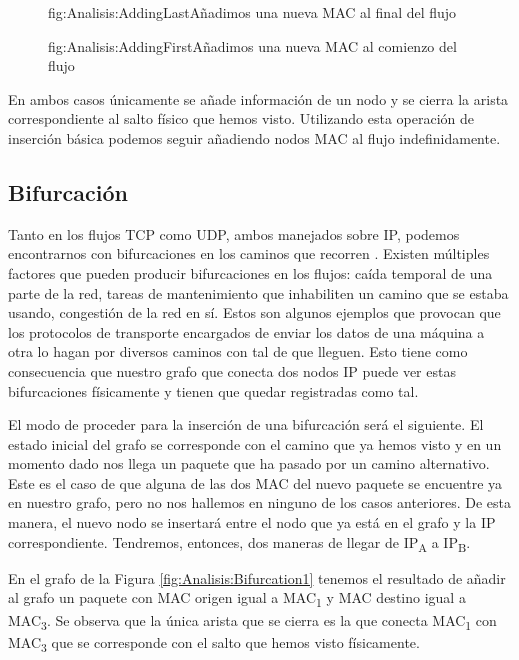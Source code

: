 \documentclass[tfg,epsbased,lof,lot,loa,final,nocopyright,overleaf]{tfgtfmthesisuam}
\begin{document}
\begin{figure}[Ejemplo inserción básica 1]{fig:Analisis:AddingLast}{Añadimos una nueva MAC al final del flujo}
    
\end{figure}
\begin{figure}[Ejemplo inserción básica 2]{fig:Analisis:AddingFirst}{Añadimos una nueva MAC al comienzo del flujo}
    
\end{figure}

En ambos casos únicamente se añade información de un nodo y se cierra la arista correspondiente al salto físico que hemos visto. Utilizando esta operación de inserción básica podemos seguir añadiendo nodos MAC al flujo indefinidamente.

\subsection{Bifurcación}
Tanto en los flujos TCP como UDP, ambos manejados sobre IP, podemos encontrarnos con bifurcaciones en los caminos que recorren \cite{Priya}. Existen múltiples factores que pueden producir bifurcaciones en los flujos: caída temporal de una parte de la red, tareas de mantenimiento que inhabiliten un camino que se estaba usando, congestión de la red en sí. Estos son algunos ejemplos que provocan que los protocolos de transporte encargados de enviar los datos de una máquina a otra lo hagan por diversos caminos con tal de que lleguen. Esto tiene como consecuencia que nuestro grafo que conecta dos nodos IP puede ver estas bifurcaciones físicamente y tienen que quedar registradas como tal.

El modo de proceder para la inserción de una bifurcación será el siguiente. El estado inicial del grafo se corresponde con el camino que ya hemos visto y en un momento dado nos llega un paquete que ha pasado por un camino alternativo. Este es el caso de que alguna de las dos MAC del nuevo paquete se encuentre ya en nuestro grafo, pero no nos hallemos en ninguno de los casos anteriores. De esta manera, el nuevo nodo se insertará entre el nodo que ya está en el grafo y la IP correspondiente. Tendremos, entonces, dos maneras de llegar de IP\textsubscript{A} a IP\textsubscript{B}.

En el grafo de la Figura \ref{fig:Analisis:Bifurcation1} tenemos el resultado de añadir al grafo un paquete con MAC origen igual a MAC\textsubscript{1} y MAC destino igual a MAC\textsubscript{3}. Se observa que la única arista que se cierra es la que conecta MAC\textsubscript{1} con MAC\textsubscript{3} que se corresponde con el salto que hemos visto físicamente.
\end{document}
